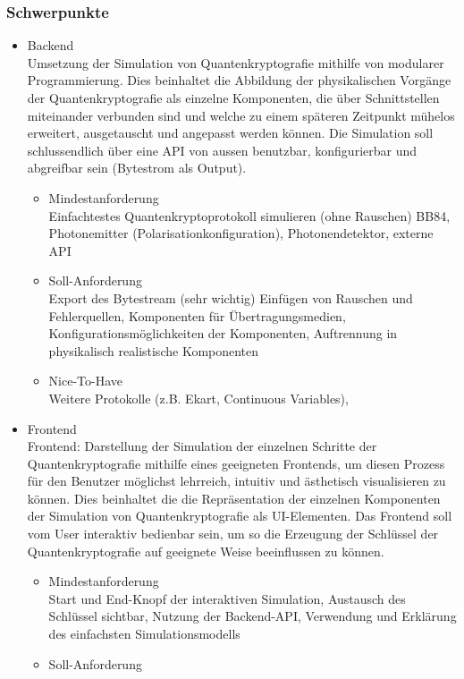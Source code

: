 \subsubsection{Schwerpunkte}
\begin{itemize} 
\item Backend \\
Umsetzung der Simulation von Quantenkryptografie mithilfe von modularer Programmierung. Dies beinhaltet die Abbildung der physikalischen Vorgänge der Quantenkryptografie als einzelne Komponenten, die über Schnittstellen miteinander verbunden sind und welche zu einem späteren Zeitpunkt mühelos erweitert, ausgetauscht und angepasst werden können. Die Simulation soll schlussendlich über eine API von aussen benutzbar, konfigurierbar und abgreifbar sein (Bytestrom als Output).\begin{itemize}
\item Mindestanforderung \\Einfachtestes Quantenkryptoprotokoll simulieren (ohne Rauschen) BB84, Photonemitter (Polarisationkonfiguration), Photonendetektor, externe API
\item Soll-Anforderung\\
Export des Bytestream (sehr wichtig)
Einfügen von Rauschen und Fehlerquellen, Komponenten für Übertragungsmedien, Konfigurationsmöglichkeiten der Komponenten, Auftrennung in physikalisch realistische Komponenten
\item Nice-To-Have\\
Weitere Protokolle (z.B. Ekart, Continuous Variables), 
\end{itemize}
\item Frontend \\
Frontend: Darstellung der Simulation der einzelnen Schritte der Quantenkryptografie mithilfe eines geeigneten Frontends, um diesen Prozess für den Benutzer möglichst lehrreich, intuitiv und ästhetisch visualisieren zu können. Dies beinhaltet die die Repräsentation der einzelnen Komponenten der Simulation von Quantenkryptografie als UI-Elementen. Das Frontend soll vom User interaktiv bedienbar sein, um so die Erzeugung der Schlüssel der Quantenkryptografie auf geeignete Weise beeinflussen zu können. \begin{itemize}
\item Mindestanforderung \\ 
Start und End-Knopf der interaktiven Simulation, Austausch des Schlüssel sichtbar, Nutzung der Backend-API, Verwendung und Erklärung des einfachsten Simulationsmodells
\item Soll-Anforderung \\

\end{itemize}
\end{itemize}
